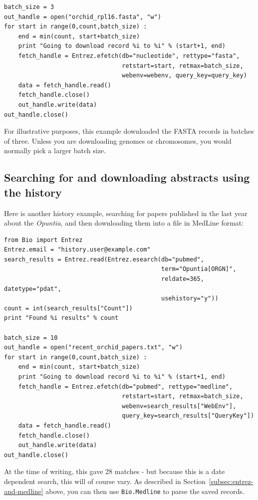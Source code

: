 \documentclass{report}
\begin{document}
\begin{verbatim}
batch_size = 3
out_handle = open("orchid_rpl16.fasta", "w")
for start in range(0,count,batch_size) :
    end = min(count, start+batch_size)
    print "Going to download record %i to %i" % (start+1, end)
    fetch_handle = Entrez.efetch(db="nucleotide", rettype="fasta",
                                 retstart=start, retmax=batch_size,
                                 webenv=webenv, query_key=query_key)
    data = fetch_handle.read()
    fetch_handle.close()
    out_handle.write(data)
out_handle.close()
\end{verbatim}

\noindent For illustrative purposes, this example downloaded the FASTA records in batches of three.  Unless you are downloading genomes or chromosomes, you would normally pick a larger batch size.

\subsection{Searching for and downloading abstracts using the history}
Here is another history example, searching for papers published in the last year about the \textit{Opuntia}, and then downloading them into a file in MedLine format:

\begin{verbatim}
from Bio import Entrez
Entrez.email = "history.user@example.com"
search_results = Entrez.read(Entrez.esearch(db="pubmed",
                                            term="Opuntia[ORGN]",
                                            reldate=365, datetype="pdat",
                                            usehistory="y"))
count = int(search_results["Count"])
print "Found %i results" % count

batch_size = 10
out_handle = open("recent_orchid_papers.txt", "w")
for start in range(0,count,batch_size) :
    end = min(count, start+batch_size)
    print "Going to download record %i to %i" % (start+1, end)
    fetch_handle = Entrez.efetch(db="pubmed", rettype="medline",
                                 retstart=start, retmax=batch_size,
                                 webenv=search_results["WebEnv"],
                                 query_key=search_results["QueryKey"])
    data = fetch_handle.read()
    fetch_handle.close()
    out_handle.write(data)
out_handle.close()
\end{verbatim}

\noindent At the time of writing, this gave 28 matches - but because this is a date dependent search, this will of course vary.  As described in Section~\ref{subsec:entrez-and-medline} above, you can then use \verb|Bio.Medline| to parse the saved records.
\end{document}
